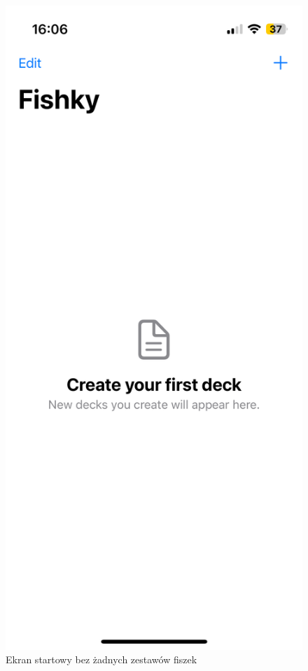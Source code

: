 \documentclass[final,a4paper,openany,12pt]{mwbk}
\begin{document}
\begin{figure}[H]
\centering
\begin{minipage}{0.5\textwidth}
  \centering
\includegraphics[width=.75\linewidth]{img/fishky1.PNG}
  \caption{Ekran startowy bez żadnych zestawów fiszek}
  \label{fig:fishky1}
\end{minipage}%
\begin{minipage}{0.5\textwidth}
  \centering

\end{minipage}
\end{figure}
\end{document}
